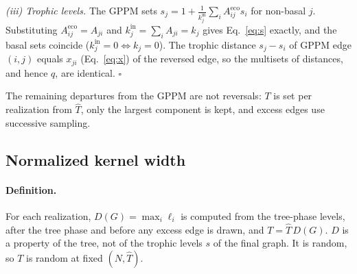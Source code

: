 \emph{(iii) Trophic levels.} The GPPM sets
$s_j=1+\frac{1}{k^{\mathrm{in}}_j}\sum_i A^{\mathrm{eco}}_{ij}s_i$ for
non-basal $j$. Substituting $A^{\mathrm{eco}}_{ij}=A_{ji}$ and
$k^{\mathrm{in}}_j=\sum_iA_{ji}=k_j$ gives Eq.~\eqref{eq:s} exactly, and the
basal sets coincide ($k^{\mathrm{in}}_j=0\iff k_j=0$). The trophic distance
$s_j-s_i$ of GPPM edge $(i,j)$ equals $x_{ji}$ (Eq.~\eqref{eq:x}) of the
reversed edge, so the multisets of distances, and hence $q$, are identical.
$\square$

The remaining departures from the GPPM are not reversals: $T$ is set per
realization from $\hat T$, only the largest component is kept, and excess
edges use successive sampling.

\subsection{Normalized kernel width}
\label{sec:that}

\paragraph{Definition.}
For each realization, $D(G)=\max_i\ell_i$ is computed from the tree-phase
levels, after the tree phase and before any excess edge is drawn, and
$T=\hat T\,D(G)$. $D$ is a property of the tree, not of the trophic levels $s$
of the final graph. It is random, so $T$ is random at fixed $(N,\hat T)$.

